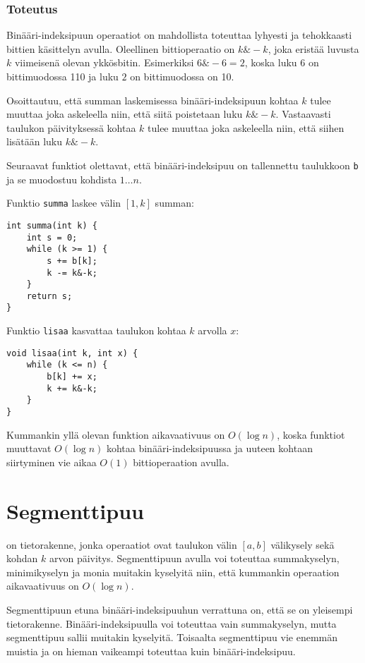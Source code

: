 \subsubsection{Toteutus}

Binääri-indeksipuun operaatiot on mahdollista toteuttaa 
lyhyesti ja tehokkaasti bittien käsittelyn avulla.
Oleellinen bittioperaatio on $k \& -k$,
joka eristää luvusta $k$ viimeisenä olevan ykkösbitin.
Esimerkiksi $6 \& -6=2$, koska luku $6$ on bittimuodossa 110
ja luku $2$ on bittimuodossa on 10.

Osoittautuu, että summan laskemisessa
binääri-indeksipuun kohtaa $k$ tulee muuttaa joka askeleella niin,
että siitä poistetaan luku $k \& -k$.
Vastaavasti taulukon päivityksessä kohtaa $k$ tulee muuttaa joka askeleella niin,
että siihen lisätään luku $k \& -k$.


Seuraavat funktiot olettavat, että binääri-indeksipuu on
tallennettu taulukkoon \texttt{b} ja se muodostuu kohdista $1 \ldots n$.

Funktio \texttt{summa} laskee välin $[1,k]$ summan:
\begin{lstlisting}
int summa(int k) {
    int s = 0;
    while (k >= 1) {
        s += b[k];
        k -= k&-k;
    }
    return s;
}
\end{lstlisting}

Funktio \texttt{lisaa} kasvattaa taulukon kohtaa $k$ arvolla $x$:
\begin{lstlisting}
void lisaa(int k, int x) {
    while (k <= n) {
        b[k] += x;
        k += k&-k;
    }
}
\end{lstlisting}

Kummankin yllä olevan funktion aikavaativuus on $O(\log n)$,
koska funktiot muuttavat $O(\log n)$ kohtaa
binääri-indeksipuussa ja uuteen kohtaan siirtyminen
vie aikaa $O(1)$ bittioperaation avulla.

\section{Segmenttipuu}


 on tietorakenne,
jonka operaatiot ovat taulukon välin $[a,b]$ välikysely
sekä kohdan $k$ arvon päivitys.
Segmenttipuun avulla voi toteuttaa summakyselyn,
minimikyselyn ja monia muitakin kyselyitä niin,
että kummankin operaation aikavaativuus on $O(\log n)$.

Segmenttipuun etuna binääri-indeksipuuhun verrattuna on,
että se on yleisempi tietorakenne.
Binääri-indeksipuulla voi toteuttaa vain summakyselyn,
mutta segmenttipuu sallii muitakin kyselyitä.
Toisaalta segmenttipuu vie enemmän muistia ja
on hieman vaikeampi toteuttaa kuin binääri-indeksipuu.


